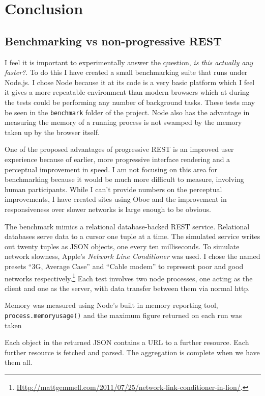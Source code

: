 \documentclass[]{article}
\let\stdsection\section
\renewcommand\section{\newpage\stdsection}
\begin{document}
\section{Conclusion}

\subsection{Benchmarking vs non-progressive REST}

I feel it is important to experimentally answer the question, \emph{is
this actually any faster?}. To do this I have created a small
benchmarking suite that runs under Node.js. I chose Node because it at
its code is a very basic platform which I feel it gives a more
repeatable environment than modern browsers which at during the tests
could be performing any number of background tasks. These tests may be
seen in the \texttt{benchmark} folder of the project. Node also has the
advantage in measuring the memory of a running process is not swamped by
the memory taken up by the browser itself.

One of the proposed advantages of progressive REST is an improved user
experience because of earlier, more progressive interface rendering and
a perceptual improvement in speed. I am not focusing on this area for
benchmarking because it would be much more difficult to measure,
involving human participants. While I can't provide numbers on the
perceptual improvements, I have created sites using Oboe and the
improvement in responsiveness over slower networks is large enough to be
obvious.

The benchmark mimics a relational database-backed REST service.
Relational databases serve data to a cursor one tuple at a time. The
simulated service writes out twenty tuples as JSON objects, one every
ten milliseconds. To simulate network slowness, Apple's \emph{Network
Line Conditioner} was used. I chose the named presets ``3G, Average
Case'' and ``Cable modem'' to represent poor and good networks
respectively.\footnote{\href{http://mattgemmell.com/2011/07/25/network-link-conditioner-in-lion/}{Http://mattgemmell.com/2011/07/25/network-link-conditioner-in-lion/}.}
Each test involves two node processes, one acting as the client and one
as the server, with data transfer between them via normal http.

Memory was measured using Node's built in memory reporting tool,
\texttt{process.memoryusage()} and the maximum figure returned on each
run was taken

Each object in the returned JSON contains a URL to a further resource.
Each further resource is fetched and parsed. The aggregation is complete
when we have them all.
\end{document}
